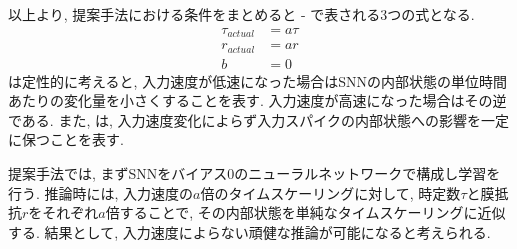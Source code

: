 以上より, 提案手法における条件をまとめると - で表される3つの式となる.
\begin{align}
    \tau_{actual} &= a \tau \label{eq:approximation:condition1:result} \\
    r_{actual} &= a r \label{eq:approximation:condition2:result} \\
    b &= 0 \label{eq:approximation:condition3:result}
\end{align}
は定性的に考えると, 入力速度が低速になった場合はSNNの内部状態の単位時間あたりの変化量を小さくすることを表す.
入力速度が高速になった場合はその逆である.
また, は, 入力速度変化によらず入力スパイクの内部状態への影響を一定に保つことを表す.

提案手法では, まずSNNをバイアス0のニューラルネットワークで構成し学習を行う.
推論時には, 入力速度の$a$倍のタイムスケーリングに対して, 時定数$\tau$と膜抵抗$r$をそれぞれ$a$倍することで, その内部状態を単純なタイムスケーリングに近似する.
結果として, 入力速度によらない頑健な推論が可能になると考えられる.
